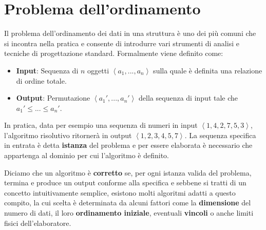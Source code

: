 \section{Problema dell'ordinamento}
Il problema dell'ordinamento dei dati in una struttura è uno dei più comuni che si incontra nella pratica e consente di introdurre vari strumenti di analisi e tecniche di progettazione standard. Formalmente viene definito come: \begin{itemize}
	\item \textbf{Input}: Sequenza di $n$ oggetti $\left<a_1, ..., a_n\right>$ sulla quale è definita una relazione di ordine totale.
	\item \textbf{Output}: Permutazione $\left<a_1', ..., a_n'\right>$ della sequenza di input tale che $a_1' \leq ... \leq a_n'$.
\end{itemize}
\noindent In pratica, data per esempio una sequenza di numeri in input $\left<1, 4, 2, 7, 5, 3\right>$, l'algoritmo risolutivo ritornerà in output $\left<1, 2, 3, 4, 5, 7\right>$. La sequenza specifica in entrata è detta \textbf{istanza} del problema e per essere elaborata è necessario che appartenga al dominio per cui l'algoritmo è definito.\par
Diciamo che un algoritmo è \textbf{corretto} se, per ogni istanza valida del problema, termina e produce un output conforme alla specifica e sebbene si tratti di un concetto intuitivamente semplice, esistono molti algoritmi adatti a questo compito, la cui scelta è determinata da alcuni fattori come la \textbf{dimensione} del numero di dati, il loro \textbf{ordinamento iniziale}, eventuali \textbf{vincoli} o anche limiti fisici dell'elaboratore. 

%

